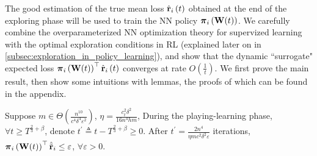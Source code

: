 The good estimation of the true mean loss $\hat{{\mathbf{r}}}_i\left(t\right)$ obtained at the end of the exploring phase will be used to train the NN policy ${\boldsymbol{\pi}}_i\left( {\mathbf{W}}(t) \right)$. We carefully combine the overparameterized NN optimization theory for supervized learning \citep{li2018learning,allen2018convergenceB} with the optimal exploration conditions in RL (explained later on in \cref{subsec:exploration_in_policy_learning}), and show that the dynamic ``surrogate" expected loss ${\boldsymbol{\pi}}_i\left( {\mathbf{W}}(t) \right)^\top \hat{{\mathbf{r}}}_i\left(t\right)$ converges at rate $O\left(\frac{1}{t} \right)$. We first prove the main result, then show some intuitions with lemmas, the proofs of which can be found in the appendix.

\begin{thm}
\label{thm:surrogate_expected_loss_convergence}
    Suppose $m \in \Theta\left( \frac{n^{10}}{c^4 \delta^4 \varepsilon^2} \right)$, $\eta = \frac{c_t^2 \delta^2}{16 n^4 h m}$, During the playing-learning phase, $\forall t \ge T^{\frac{2}{3} + \beta}$, denote $t^\prime \triangleq t - T^{\frac{2}{3} + \beta} \ge 0$. After $t^\prime = \frac{2n^4}{\eta m c^2 \delta^2 \varepsilon}$ iterations, ${\boldsymbol{\pi}}_i\left( {\mathbf{W}}(t) \right)^\top \hat{{\tilde{\mathbf{r}}}}_i \le \varepsilon$, $\forall \varepsilon > 0$.
\end{thm}
